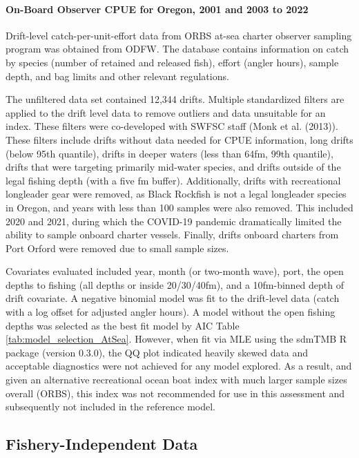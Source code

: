 \documentclass[11pt,
  letterpaper,
]{article}
\begin{document}
\hypertarget{on-board-observer-cpue-for-oregon-2001-and-2003-to-2022}{%
\paragraph{On-Board Observer CPUE for Oregon, 2001 and 2003 to 2022}\label{on-board-observer-cpue-for-oregon-2001-and-2003-to-2022}}

Drift-level catch-per-unit-effort data from ORBS at-sea charter observer sampling program was obtained from ODFW. The database contains information on catch by species (number of retained and released fish), effort (angler hours), sample depth, and bag limits and other relevant regulations.

The unfiltered data set contained 12,344 drifts. Multiple standardized filters are applied to the drift level data to remove outliers and data unsuitable for an index. These filters were co-developed with SWFSC staff (Monk et al. (2013)). These filters include drifts without data needed for CPUE information, long drifts (below 95th quantile), drifts in deeper waters (less than 64fm, 99th quantile), drifts that were targeting primarily mid-water species, and drifts outside of the legal fishing depth (with a five fm buffer). Additionally, drifts with recreational longleader gear were removed, as Black Rockfish is not a legal longleader species in Oregon, and years with less than 100 samples were also removed. This included 2020 and 2021, during which the COVID-19 pandemic dramatically limited the ability to sample onboard charter vessels. Finally, drifts onboard charters from Port Orford were removed due to small sample sizes.

Covariates evaluated included year, month (or two-month wave), port, the open depths to fishing (all depths or inside 20/30/40fm), and a 10fm-binned depth of drift covariate. A negative binomial model was fit to the drift-level data (catch with a log offset for adjusted angler hours). A model without the open fishing depths was selected as the best fit model by AIC Table \ref{tab:model_selection_AtSea}. However, when fit via MLE using the sdmTMB R package (version 0.3.0), the QQ plot indicated heavily skewed data and acceptable diagnostics were not achieved for any model explored. As a result, and given an alternative recreational ocean boat index with much larger sample sizes overall (ORBS), this index was not recommended for use in this assessment and subsequently not included in the reference model.

\hypertarget{fishery-independent-data}{%
\subsection{Fishery-Independent Data}\label{fishery-independent-data}}
\end{document}
